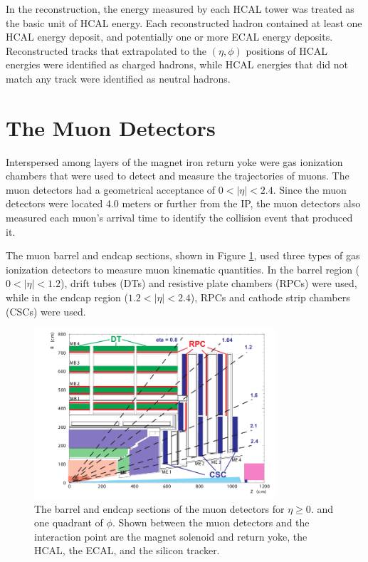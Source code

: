 In the reconstruction, the energy measured by each HCAL tower was treated as the basic unit of HCAL energy.  
Each reconstructed hadron contained at least one HCAL energy deposit, and potentially one or more ECAL energy 
deposits.  Reconstructed tracks that extrapolated to the $(\eta,\phi)$ positions of HCAL energies were identified 
as charged hadrons, while HCAL energies that did not match any track were identified as neutral hadrons.


\section{The Muon Detectors}
\label{sec:muonDetectorsDescription}
Interspersed among layers of the magnet iron return yoke were gas ionization chambers that were used to detect and measure the 
trajectories of muons.  The muon detectors had a geometrical acceptance of $0 < |\eta| < 2.4$.  Since the muon detectors were 
located 4.0 meters or further from the IP, the muon detectors also measured each muon's arrival time to identify the collision 
event that produced it.

The muon barrel and endcap sections, shown in Figure \ref{fig:muonBarrelAndEndcapDetectors}, used three types of gas ionization 
detectors to measure muon kinematic quantities.  In the barrel region ($0 < |\eta| < 1.2$), drift tubes (DTs) and resistive plate 
chambers (RPCs) were used, while in the endcap region ($1.2 < |\eta| < 2.4$), RPCs and cathode strip chambers (CSCs) were used.

\begin{figure}[ht]
	\centering
	\includegraphics[width=0.8\textwidth]{figures/muonDetectorLayout.png}
	\caption{The barrel and endcap sections of the muon detectors for $\eta \geq 0.$ and one quadrant of $\phi$.  Shown 
		between the muon detectors and the interaction point are the magnet solenoid and return yoke, the HCAL, the ECAL, 
		and the silicon tracker.}
	\label{fig:muonBarrelAndEndcapDetectors}
\end{figure}

